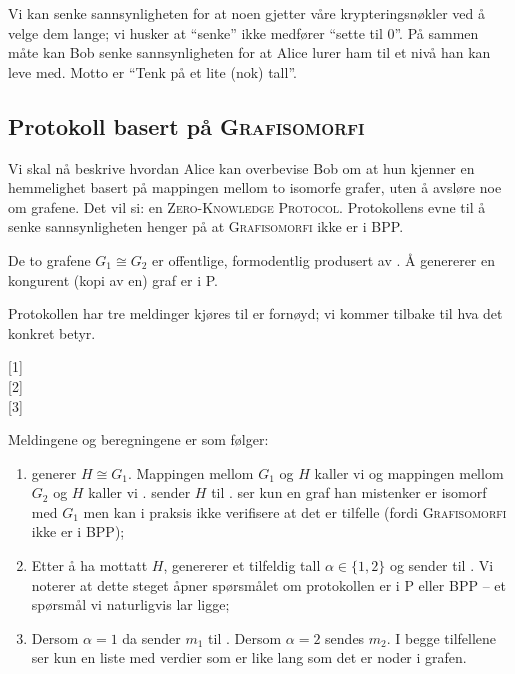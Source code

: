 \documentclass[a4paper, parskip=half]{scrartcl}
\theoremstyle{definition}
\begin{document}
Vi kan senke sannsynligheten for at noen gjetter våre
krypteringsnøkler ved å velge dem lange; vi husker at ``senke'' ikke 
medfører ``sette til 0''.  På sammen måte kan Bob senke
sannsynligheten for at Alice lurer ham til et nivå han kan leve med.
Motto er ``Tenk på et lite (nok) tall''.



\subsection{Protokoll basert på \textsc{Grafisomorfi}}
\label{sec:grafisomorfi}

Vi skal nå beskrive hvordan Alice kan overbevise Bob om at hun kjenner
en hemmelighet basert på mappingen mellom to isomorfe grafer, uten å
avsløre noe om grafene.  Det vil si: en \textsc{Zero-Knowledge
Protocol}.  Protokollens evne til å senke sannsynligheten henger
på at \textsc{Grafisomorfi} ikke er i \textsf{BPP}.

De to grafene $G_1 \cong G_2$ er offentlige, formodentlig produsert av
.  Å genererer en kongurent (kopi av en) graf er i \textsf{P}.

Protokollen har tre meldinger kjøres til  er fornøyd;
vi kommer tilbake til hva det konkret betyr.

\begin{ASteps}
  [1] \\
  [2] \\
  [3]
\end{ASteps}

Meldingene og beregningene er som følger:

\begin{enumerate}
\item[$M_1$]  generer $H \cong G_1$.  Mappingen
  mellom $G_1$ og $H$ kaller vi  og mappingen mellom $G_2$
  og $H$ kaller vi .   sender $H$ til 
  .   ser kun en graf han mistenker er isomorf med
  $G_1$ men kan i praksis ikke verifisere at det er tilfelle (fordi
  \textsc{Grafisomorfi} ikke er i \textsf{BPP});

\item[$M_2$] Etter å ha mottatt $H$, genererer  et tilfeldig tall
  $\alpha \in \{1,2\}$ og sender til .  Vi noterer at dette
  steget åpner spørsmålet om protokollen er i \textsf{P} eller
  \textsf{BPP} -- et spørsmål vi naturligvis lar ligge;

\item[$M_3$] Dersom $\alpha=1$ da sender  $m_1$ til .
  Dersom $\alpha = 2$ sendes $m_2$.
  I begge tilfellene ser 
  kun en liste med verdier som er like lang som det er noder i
  grafen.
\end{enumerate}
\end{document}
